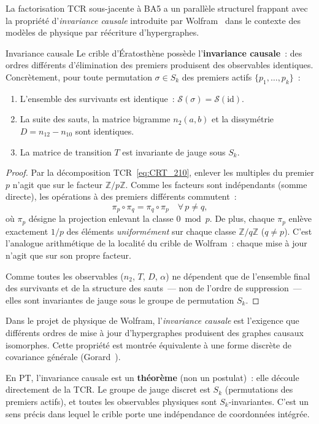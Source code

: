 \documentclass[12pt,a4paper]{article}
\begin{document}
La factorisation TCR sous-jacente à BA5 a un parallèle structurel
frappant avec la propriété d'\emph{invariance causale} introduite
par Wolfram~\cite{Wolfram2020} dans le contexte des modèles de
physique par réécriture d'hypergraphes.

\begin{thmbox}{Invariance causale}
\label{thm:causal_invariance}
Le crible d'Ératosthène possède l'\textbf{invariance causale}~:
des ordres différents d'élimination des premiers produisent des
observables identiques. Concrètement, pour toute permutation
$\sigma \in S_k$ des premiers actifs $\{p_1, \ldots, p_k\}$~:
\begin{enumerate}[nosep]
\item L'ensemble des survivants est identique~:
  $\mathcal{S}(\sigma) = \mathcal{S}(\mathrm{id})$.
\item La suite des sauts, la matrice bigramme $n_2(a,b)$ et la
  dissymétrie $D = n_{12} - n_{10}$ sont identiques.
\item La matrice de transition $T$ est invariante de jauge sous
  $S_k$.
\end{enumerate}

\begin{proof}
Par la décomposition TCR~\eqref{eq:CRT_210}, enlever les multiples
du premier $p$ n'agit que sur le facteur $\mathbb{Z}/p\mathbb{Z}$.
Comme les facteurs sont indépendants (somme directe), les
opérations à des premiers différents commutent~:
\begin{equation}
  \pi_p \circ \pi_q = \pi_q \circ \pi_p \quad \forall\, p \neq q,
  \label{eq:commutation}
\end{equation}
où $\pi_p$ désigne la projection enlevant la classe
$0 \bmod p$. De plus, chaque $\pi_p$ enlève exactement $1/p$ des
éléments \emph{uniformément} sur chaque classe
$\mathbb{Z}/q\mathbb{Z}$ ($q \neq p$). C'est l'analogue
arithmétique de la localité du crible de Wolfram~: chaque mise à
jour n'agit que sur son propre facteur.

Comme toutes les observables ($n_2$, $T$, $D$, $\alpha$) ne
dépendent que de l'ensemble final des survivants et de la
structure des sauts~--- non de l'ordre de suppression~--- elles
sont invariantes de jauge sous le groupe de permutation $S_k$.
\end{proof}
\end{thmbox}

\begin{remarque}\mBR
\label{rem:wolfram_parallel}
Dans le projet de physique de Wolfram, l'\emph{invariance causale}
est l'exigence que différents ordres de mise à jour
d'hypergraphes produisent des graphes causaux isomorphes. Cette
propriété est montrée équivalente à une forme discrète de
covariance générale (Gorard~\cite{Gorard2020}).

En PT, l'invariance causale est un \textbf{théorème} (non un
postulat)~: elle découle directement de la TCR. Le groupe de jauge
discret est $S_k$ (permutations des premiers actifs), et toutes
les observables physiques sont $S_k$-invariantes. C'est un sens
précis dans lequel le crible porte une indépendance de coordonnées
intégrée.
\end{remarque}
\end{document}
